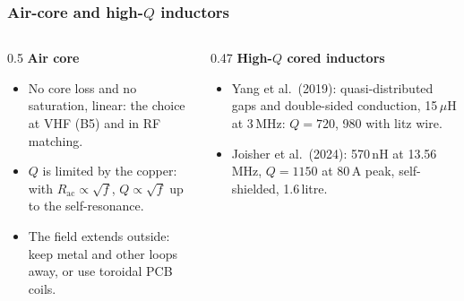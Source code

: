\begin{frame}
	\frametitle{Air-core and high-$Q$ inductors}
	\begin{columns}[T]
		\begin{column}{0.5\textwidth}
			\small
			\textbf{Air core}
			\begin{itemize}
				\item No core loss and no saturation, linear: the choice at VHF (B5) and in RF matching.
				\item $Q$ is limited by the copper: with $R_\mathrm{ac}\propto\sqrt{f}$, $Q\propto\sqrt{f}$ up to the self-resonance.
				\item The field extends outside: keep metal and other loops away, or use toroidal PCB coils.
			\end{itemize}
		\end{column}
		\begin{column}{0.47\textwidth}
			\small
			\textbf{High-$Q$ cored inductors}
			\begin{itemize}
				\item Yang et al.\ (2019): quasi-distributed gaps and double-sided conduction, 15\,$\mu$H at 3\,MHz: $Q=720$, 980 with litz wire.
				\item Joisher et al.\ (2024): 570\,nH at 13.56\,MHz, $Q=1150$ at 80\,A peak, self-shielded, 1.6\,litre.
			\end{itemize}
		\end{column}
	\end{columns}
\end{frame}

